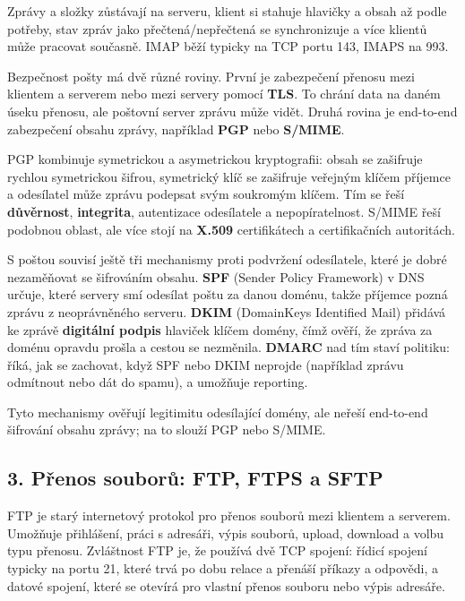 Zprávy a složky zůstávají na serveru, klient si stahuje hlavičky a obsah až podle potřeby, stav zpráv jako přečtená/nepřečtená se synchronizuje a více klientů může pracovat současně. IMAP běží typicky na TCP portu 143, IMAPS na 993.

Bezpečnost pošty má dvě různé roviny. První je zabezpečení přenosu mezi klientem a serverem nebo mezi servery pomocí \textbf{TLS}. To chrání data na daném úseku přenosu, ale poštovní server zprávu může vidět. Druhá rovina je end-to-end zabezpečení obsahu zprávy, například \textbf{PGP} nebo \textbf{S/MIME}.

PGP kombinuje symetrickou a asymetrickou kryptografii: obsah se zašifruje rychlou symetrickou šifrou, symetrický klíč se zašifruje veřejným klíčem příjemce a odesílatel může zprávu podepsat svým soukromým klíčem. Tím se řeší \textbf{důvěrnost}, \textbf{integrita}, autentizace odesílatele a nepopíratelnost. S/MIME řeší podobnou oblast, ale více stojí na \textbf{X.509} certifikátech a certifikačních autoritách.

S poštou souvisí ještě tři mechanismy proti podvržení odesílatele, které je dobré nezaměňovat se šifrováním obsahu. \textbf{SPF} (Sender Policy Framework) v DNS určuje, které servery smí odesílat poštu za danou doménu, takže příjemce pozná zprávu z neoprávněného serveru. \textbf{DKIM} (DomainKeys Identified Mail) přidává ke zprávě \textbf{digitální podpis} hlaviček klíčem domény, čímž ověří, že zpráva za doménu opravdu prošla a cestou se nezměnila. \textbf{DMARC} nad tím staví politiku: říká, jak se zachovat, když SPF nebo DKIM neprojde (například zprávu odmítnout nebo dát do spamu), a umožňuje reporting.

Tyto mechanismy ověřují legitimitu odesílající domény, ale neřeší end-to-end šifrování obsahu zprávy; na to slouží PGP nebo S/MIME.


\subsection*{3. Přenos souborů: FTP, FTPS a SFTP}

FTP je starý internetový protokol pro přenos souborů mezi klientem a serverem. Umožňuje přihlášení, práci s adresáři, výpis souborů, upload, download a volbu typu přenosu. Zvláštnost FTP je, že používá dvě TCP spojení: řídicí spojení typicky na portu 21, které trvá po dobu relace a přenáší příkazy a odpovědi, a datové spojení, které se otevírá pro vlastní přenos souboru nebo výpis adresáře.

